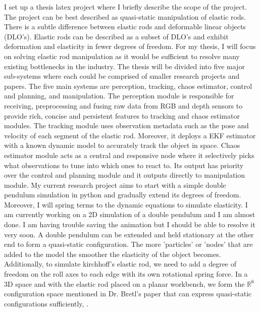 I set up a thesis latex project where I briefly describe the
      scope of the project. The project can be best described as quasi-static
      manipulation of elastic rods. There is a subtle difference between elastic
      rods and deformable linear objects (DLO's). Elastic rods can be described as a
      subset of DLO's and exhibit deformation and elasticity in fewer degrees of
      freedom. For my thesis, I will focus on solving elastic rod manipulation
      as it would be sufficient to resolve many existing bottlenecks in the
      industry. The thesis will be divided into five major sub-systems where
      each could be comprised of smaller research projects and papers.
      The five main systems are perception, tracking, chaos estimator,
      control and planning, and manipulation.
      The perception module is responsible for receiving, preprocessing and
      fusing raw data from RGB and depth sensors to provide rich, concise and
      persistent features to tracking and chaos estimator modules.
      The tracking module uses observation metadata such as the pose and velocity
      of each segment of the elastic rod. Moreover, it deploys a EKF estimator
      with a known dynamic model to accurately track the object in space. Chaos
      estimator module acts as a central and responsive node where it selectively
      picks what observations to tune into which ones to react to. Its output
      has priority over the control and planning module and it outputs directly
      to manipulation module.
      My current research project aims to start with a simple double pendulum simulation in python and gradually extend its degrees of freedom.
      Moreover, I will spring terms to the dynamic equations to simulate elasticity. I am currently working on a 2D simulation of a double pendulum and
      I am almost done. I am having trouble saving the animation but I should be able to resolve it very soon. A double pendulum can be extended and held
      stationary at the other end to form a quasi-static configuration. The more
      'particles' or 'nodes' that are added to the model the smoother the elasticity
      of the object becomes. Additionally, to simulate kirchhoff's elastic rod,
      we need to add a degree of freedom on the roll axes to each edge with its
      own rotational spring force. In a 3D space and with the elastic rod placed
      on a planar workbench, we form the \(\mathbb{R}^6\) configuration space
      mentioned in Dr. Bretl's paper that can express quasi-static configurations
      sufficiently, \cite{Quasi-static}.
